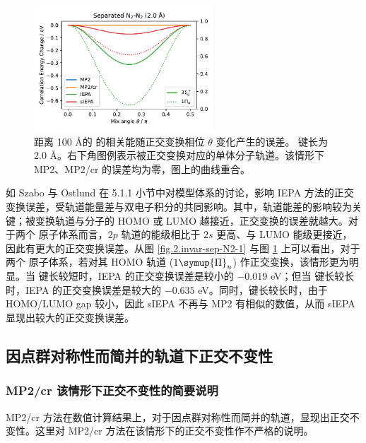 \begin{figure}[!ht]
  \centering
  \includegraphics[width=0.6\textwidth]{assets/invar-sep-N2-2.pdf}
  \caption[ 对称性简并轨道正交变换误差 (键长 2.0 \AA)]{距离 100 \AA 的  的相关能随正交变换相位 $\theta$ 变化产生的误差。 键长为 2.0 \AA。右下角图例表示被正交变换对应的单体分子轨道。该情形下 MP2、MP2/cr 的误差均为零，图上的曲线重合。}
  \label{fig.2.invar-sep-N2-2}
\end{figure}

如 Szabo 与 Ostlund 在 5.1.1 小节中对模型体系的讨论\cite{Szabo-Ostlund.Dover.1996}，影响 IEPA 方法的正交变换误差，受轨道能量差与双电子积分的共同影响。其中，轨道能差的影响较为关键；被变换轨道与分子的 HOMO 或 LUMO 越接近，正交变换的误差就越大。对于两个  原子体系而言，$2p$ 轨道的能级相比于 $2s$ 更高、与 LUMO 能级更接近，因此有更大的正交变换误差。从图 \ref{fig.2.invar-sep-N2-1} 与图 \ref{fig.2.invar-sep-N2-2} 上可以看出，对于两个  原子体系，若对其 HOMO 轨道 ($1 \symup{\Pi}_u$) 作正交变换，该情形更为明显。当  键长较短时，IEPA 的正交变换误差是较小的 $-0.019$ eV；但当  键长较长时，IEPA 的正交变换误差是较大的 $-0.635$ eV。同时，键长较长时，由于 HOMO/LUMO gap 较小，因此 sIEPA 不再与 MP2 有相似的数值，从而 sIEPA 显现出较大的正交变换误差。

\subsection{因点群对称性而简并的轨道下正交不变性}

\subsubsection{MP2/cr 该情形下正交不变性的简要说明}

MP2/cr 方法在数值计算结果上，对于因点群对称性而简并的轨道，显现出正交不变性。这里对 MP2/cr 方法在该情形下的正交不变性作不严格的说明。

